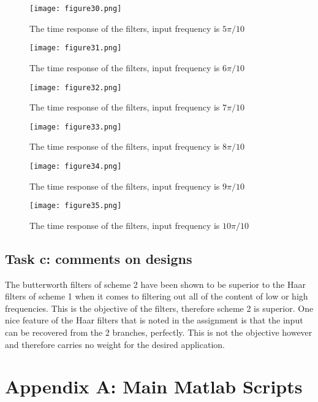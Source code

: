 \documentclass[12pt]{scrartcl} %
\begin{document}
		\begin{figure}[H]
			\centering
			\texttt{[image: figure30.png]}
			\caption{The time response of the filters, input frequency is  $5\pi/10$}
		\end{figure}	
		
		\begin{figure}[H]
			\centering
			\texttt{[image: figure31.png]}
			\caption{The time response of the filters, input frequency is  $6\pi/10$}
		\end{figure}
		
		\begin{figure}[H]
			\centering
			\texttt{[image: figure32.png]}
			\caption{The time response of the filters, input frequency is  $7\pi/10$}
		\end{figure}
		
		\begin{figure}[H]
			\centering
			\texttt{[image: figure33.png]}
			\caption{The time response of the filters, input frequency is  $8\pi/10$}
		\end{figure}
		
		\begin{figure}[H]
			\centering
			\texttt{[image: figure34.png]}
			\caption{The time response of the filters, input frequency is  $9\pi/10$}
		\end{figure}
		
		\begin{figure}[H]
			\centering
			\texttt{[image: figure35.png]}
			\caption{The time response of the filters, input frequency is  $10\pi/10$}
		\end{figure}
		
		
		\subsection{Task c: comments on designs}
		
		The butterworth filters of scheme 2 have been shown to be superior to the Haar filters of scheme 1 when it comes to filtering out all of the content of low or high frequencies. This is the objective of the filters, therefore scheme 2 is superior. One nice feature of the Haar filters that is noted in the assignment is that the input can be recovered from the 2 branches, perfectly. This is not the objective however and therefore carries no weight for the desired application.
		
		\section{Appendix A: Main Matlab Scripts}
		
\end{document}
